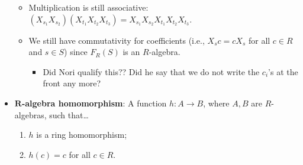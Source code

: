 \documentclass[../notes.tex]{subfiles}
\begin{document}
\begin{itemize}
\begin{itemize}
        \item Multiplication is still associative: $(X_{s_1}X_{s_2})(X_{t_1}X_{t_2}X_{t_3})=X_{s_1}X_{s_2}X_{t_1}X_{t_2}X_{t_3}$.
        \item We still have commutativity for coefficients (i.e., $X_sc=cX_s$ for all $c\in R$ and $s\in S$) since $F_R(S)$ is an $R$-algebra.
        \begin{itemize}
            \item Did Nori qualify this?? Did he say that we do not write the $c_i$'s at the front any more?
        \end{itemize}
    \end{itemize}
    \item \textbf{$\bm{R}$-algebra homomorphism}: A function $h:A\to B$, where $A,B$ are $R$-algebras, such that\dots
    \begin{enumerate}[label={(\roman*)}]
        \item $h$ is a ring homomorphism;
        \item $h(c)=c$ for all $c\in R$.
    \end{enumerate}
    \begin{figure}[h!]
        \centering
\end{figure}
\end{itemize}
\end{document}
